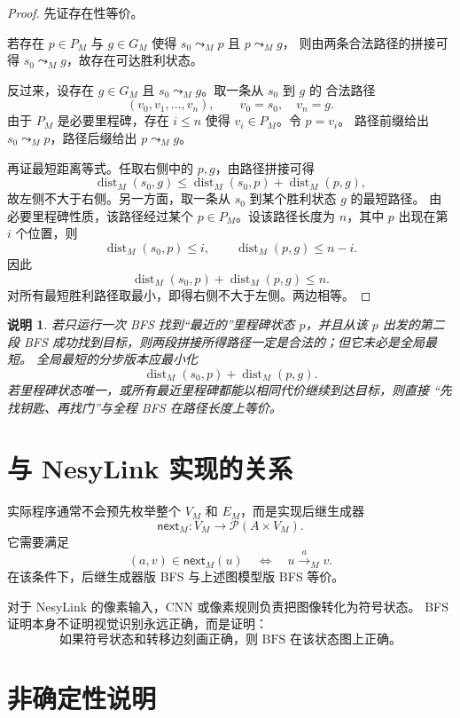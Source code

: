 \documentclass[UTF8]{ctexart}
\theoremstyle{nesylinkblock}
\newtheorem{remark}{说明}
\DeclareMathOperator{\dist}{dist}
\begin{document}
\begin{proof}
先证存在性等价。

若存在 $p\in P_M$ 与 $g\in G_M$ 使得 $s_0\leadsto_M p$ 且 $p\leadsto_M g$，
则由两条合法路径的拼接可得 $s_0\leadsto_M g$，故存在可达胜利状态。

反过来，设存在 $g\in G_M$ 且 $s_0\leadsto_M g$。取一条从 $s_0$ 到 $g$ 的
合法路径
\[
  (v_0,v_1,\ldots,v_n),\qquad v_0=s_0,\quad v_n=g.
\]
由于 $P_M$ 是必要里程碑，存在 $i\le n$ 使得 $v_i\in P_M$。令 $p=v_i$。
路径前缀给出 $s_0\leadsto_M p$，路径后缀给出 $p\leadsto_M g$。

再证最短距离等式。任取右侧中的 $p,g$，由路径拼接可得
\[
  \dist_M(s_0,g)\le \dist_M(s_0,p)+\dist_M(p,g),
\]
故左侧不大于右侧。另一方面，取一条从 $s_0$ 到某个胜利状态 $g$ 的最短路径。
由必要里程碑性质，该路径经过某个 $p\in P_M$。设该路径长度为 $n$，其中
$p$ 出现在第 $i$ 个位置，则
\[
  \dist_M(s_0,p)\le i,\qquad
  \dist_M(p,g)\le n-i.
\]
因此
\[
  \dist_M(s_0,p)+\dist_M(p,g)\le n.
\]
对所有最短胜利路径取最小，即得右侧不大于左侧。两边相等。
\end{proof}

\begin{remark}
若只运行一次 BFS 找到“最近的”里程碑状态 $p$，并且从该 $p$ 出发的第二段
BFS 成功找到目标，则两段拼接所得路径一定是合法的；但它未必是全局最短。
全局最短的分步版本应最小化
\[
  \dist_M(s_0,p)+\dist_M(p,g).
\]
若里程碑状态唯一，或所有最近里程碑都能以相同代价继续到达目标，则直接
“先找钥匙、再找门”与全程 BFS 在路径长度上等价。
\end{remark}

\section{与 NesyLink 实现的关系}

实际程序通常不会预先枚举整个 $V_M$ 和 $E_M$，而是实现后继生成器
\[
  \mathsf{next}_M:V_M\to\mathcal{P}(A\times V_M).
\]
它需要满足
\[
  (a,v)\in\mathsf{next}_M(u)
  \quad\Longleftrightarrow\quad
  u\xrightarrow{a}_M v.
\]
在该条件下，后继生成器版 BFS 与上述图模型版 BFS 等价。

对于 NesyLink 的像素输入，CNN 或像素规则负责把图像转化为符号状态。
BFS 证明本身不证明视觉识别永远正确，而是证明：
\[
  \text{如果符号状态和转移边刻画正确，则 BFS 在该状态图上正确。}
\]

\section{非确定性说明}
\end{document}
